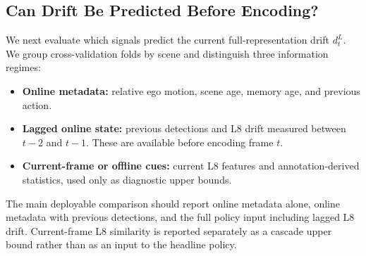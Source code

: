 \documentclass[10pt,twocolumn,letterpaper]{article}
\begin{document}
\subsection{Can Drift Be Predicted Before Encoding?}

We next evaluate which signals predict the current full-representation
drift $d_t^L$. We group cross-validation folds by scene and distinguish
three information regimes:
\begin{itemize}[leftmargin=*]
    \item \textbf{Online metadata:} relative ego motion, scene age,
    memory age, and previous action.
    \item \textbf{Lagged online state:} previous detections and L8
    drift measured between $t-2$ and $t-1$. These are available before
    encoding frame $t$.
    \item \textbf{Current-frame or offline cues:} current L8 features
    and annotation-derived statistics, used only as diagnostic upper
    bounds.
\end{itemize}

The main deployable comparison should report online metadata alone,
online metadata with previous detections, and the full policy input
including lagged L8 drift. Current-frame L8 similarity is reported
separately as a cascade upper bound rather than as an input to the
headline policy.
\end{document}

